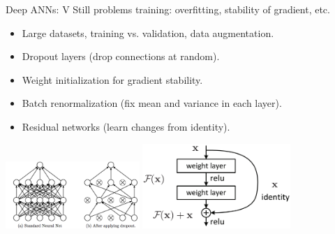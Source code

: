 \documentclass{beamer}
\begin{document}
\begin{frame}{Deep ANNs: V}
    Still problems training: overfitting, stability of gradient, etc.

    \begin{itemize}
        \item Large datasets, training vs. validation, data augmentation.
        \item Dropout layers (drop connections at random).
        \item Weight initialization for gradient stability.
        \item Batch renormalization (fix mean and variance in each layer).
        \item Residual networks (learn changes from identity).
    \end{itemize}

    \begin{center}
      \includegraphics[width=0.38\textwidth]{./Figures/dropout}
        \hspace{0.5cm}
      \includegraphics[width=0.42\textwidth]{./Figures/resnet_layer}
    \end{center}

\end{frame}
\end{document}
